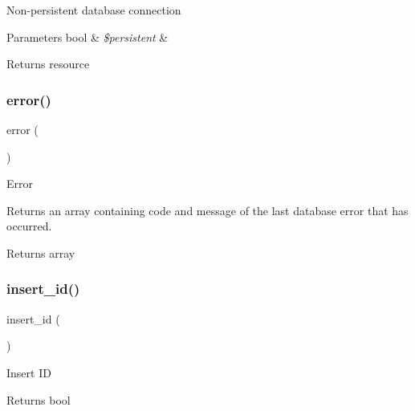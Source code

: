 Non-\/persistent database connection


\begin{DoxyParams}[1]{Parameters}
bool & {\em \$persistent} & \\
\hline
\end{DoxyParams}
\begin{DoxyReturn}{Returns}
resource 
\end{DoxyReturn}
\mbox{\label{class_c_i___d_b__odbc__driver_a43b8d30b879d4f09ceb059b02af2bc02}} 
\subsubsection{\texorpdfstring{error()}{error()}}
{\footnotesize\ttfamily error (\begin{DoxyParamCaption}{ }\end{DoxyParamCaption})}

Error

Returns an array containing code and message of the last database error that has occurred.

\begin{DoxyReturn}{Returns}
array 
\end{DoxyReturn}
\mbox{\label{class_c_i___d_b__odbc__driver_a933f2cde8dc7f87875e257d0a4902e99}} 
\subsubsection{\texorpdfstring{insert\+\_\+id()}{insert\_id()}}
{\footnotesize\ttfamily insert\+\_\+id (\begin{DoxyParamCaption}{ }\end{DoxyParamCaption})}

Insert ID

\begin{DoxyReturn}{Returns}
bool 
\end{DoxyReturn}
\mbox{\label{class_c_i___d_b__odbc__driver_af435df5703c238769d6d16fde6d51182}} 
